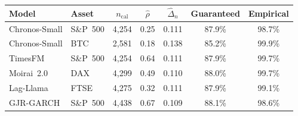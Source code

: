 \begin{tabular}{@{}llccccc@{}}
\hline\hline
Model & Asset & $n_{\mathrm{cal}}$ & $\hat\rho$ & $\hat\Delta_n$ & Guaranteed & Empirical \\
\hline
		Chronos-Small & S\&P~500 & 4{,}254 & 0.25 & 0.111 & 87.9\% & 98.7\% \\
		Chronos-Small & BTC & 2{,}581 & 0.18 & 0.138 & 85.2\% & 99.9\% \\
		TimesFM & S\&P~500 & 4{,}254 & 0.64 & 0.111 & 87.9\% & 99.7\% \\
		Moirai~2.0 & DAX & 4{,}299 & 0.49 & 0.110 & 88.0\% & 99.7\% \\
		Lag-Llama & FTSE & 4{,}275 & 0.32 & 0.111 & 87.9\% & 99.1\% \\
		GJR-GARCH & S\&P~500 & 4{,}438 & 0.67 & 0.109 & 88.1\% & 98.6\% \\
\hline\hline
\end{tabular}
